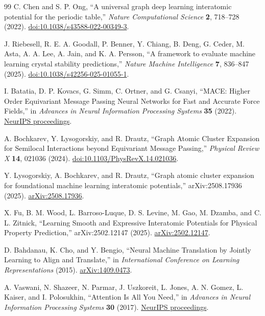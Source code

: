 \documentclass[aps,prx,preprint,notitlepage,superscriptaddress,nofootinbib,floatfix]{revtex4-2}
\newif\ifshowrevisions
\newcommand{\draftthirteen}[1]{%
  \ifshowrevisions\textcolor{draftthirteencolor}{#1}\else#1\fi}
\newcommand{\draftfourteen}[1]{%
  \ifshowrevisions\textcolor{draftfourteencolor}{#1}\else#1\fi}
\newcommand{\drafttwentyfour}[1]{%
  \ifshowrevisions\textcolor{drafttwentyfourcolor}{#1}\else#1\fi}
\begin{document}
\begin{thebibliography}{99}
\draftthirteen{C. Chen and S. P. Ong,
``A universal graph deep learning interatomic potential for the periodic
table,'' \emph{Nature Computational Science} \textbf{2}, 718--728 (2022).
\href{https://doi.org/10.1038/s43588-022-00349-3}{doi:10.1038/s43588-022-00349-3}.}

\draftfourteen{J. Riebesell, R. E. A. Goodall, P. Benner, Y. Chiang, B. Deng,
G. Ceder, M. Asta, A. A. Lee, A. Jain, and K. A. Persson,
``A framework to evaluate machine learning crystal stability predictions,''
\emph{Nature Machine Intelligence} \textbf{7}, 836--847 (2025).
\href{https://doi.org/10.1038/s42256-025-01055-1}{doi:10.1038/s42256-025-01055-1}.}

I. Batatia, D. P. Kovacs, G. Simm, C. Ortner, and G. Csanyi,
``MACE: Higher Order Equivariant Message Passing Neural Networks for Fast and
Accurate Force Fields,'' in \emph{Advances in Neural Information Processing
Systems} \textbf{35} (2022).
\href{https://proceedings.neurips.cc/paper_files/paper/2022/hash/4a36c3c51af11ed9f34615b81edb5bbc-Abstract-Conference.html}{NeurIPS proceedings}.

A. Bochkarev, Y. Lysogorskiy, and R. Drautz,
``Graph Atomic Cluster Expansion for Semilocal Interactions beyond Equivariant
Message Passing,'' \emph{Physical Review X} \textbf{14}, 021036 (2024).
\href{https://doi.org/10.1103/PhysRevX.14.021036}{doi:10.1103/PhysRevX.14.021036}.

Y. Lysogorskiy, A. Bochkarev, and R. Drautz,
``Graph atomic cluster expansion for foundational machine learning interatomic
potentials,'' arXiv:2508.17936 (2025).
\href{https://arxiv.org/abs/2508.17936}{arXiv:2508.17936}.

\drafttwentyfour{X. Fu, B. M. Wood, L. Barroso-Luque, D. S. Levine, M. Gao,
M. Dzamba, and C. L. Zitnick,
``Learning Smooth and Expressive Interatomic Potentials for Physical Property
Prediction,'' arXiv:2502.12147 (2025).
\href{https://arxiv.org/abs/2502.12147}{arXiv:2502.12147}.}

D. Bahdanau, K. Cho, and Y. Bengio,
``Neural Machine Translation by Jointly Learning to Align and Translate,''
in \emph{International Conference on Learning Representations} (2015).
\href{https://arxiv.org/abs/1409.0473}{arXiv:1409.0473}.

A. Vaswani, N. Shazeer, N. Parmar, J. Uszkoreit, L. Jones, A. N. Gomez,
L. Kaiser, and I. Polosukhin,
``Attention Is All You Need,'' in \emph{Advances in Neural Information
Processing Systems} \textbf{30} (2017).
\href{https://papers.nips.cc/paper_files/paper/2017/hash/3f5ee243547dee91fbd053c1c4a845aa-Abstract.html}{NeurIPS proceedings}.


\end{thebibliography}
\end{document}
